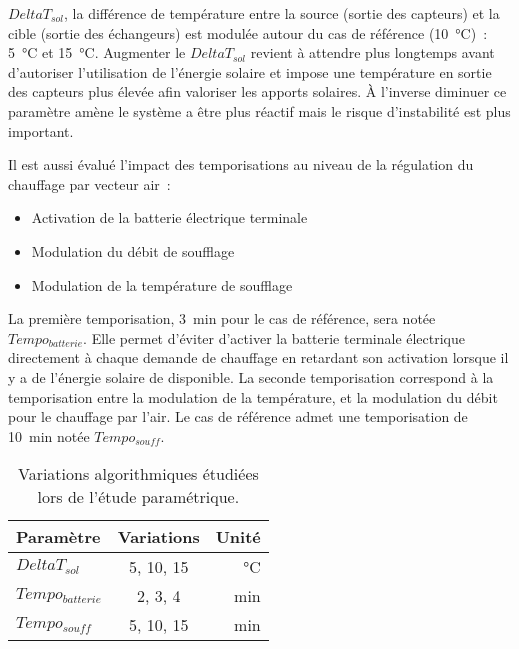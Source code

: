 $DeltaT_{sol}$, la différence de température entre la source (sortie des capteurs) et la cible (sortie des
échangeurs) est modulée autour du cas de référence (\SI{10}{\celsius})~: \SI{5}{\celsius} et \SI{15}{\celsius}.
Augmenter le $DeltaT_{sol}$ revient à
attendre plus longtemps avant d’autoriser l’utilisation de l’énergie solaire et impose une
température en sortie des capteurs plus élevée afin valoriser les apports solaires. À
l’inverse diminuer ce paramètre amène le système a être plus réactif mais le risque
d’instabilité est plus important.

Il est aussi évalué l’impact des temporisations au niveau de la régulation du chauffage
par vecteur air~:
\begin{itemize}
  \item Activation de la batterie électrique terminale
  \item Modulation du débit de soufflage
  \item Modulation de la température de soufflage
\end{itemize}

La première temporisation, \SI{3}{min} pour le cas de référence, sera notée
$Tempo_{batterie}$. Elle permet d’éviter d’activer la batterie terminale électrique
directement à chaque demande de chauffage en retardant son activation lorsque il y a de
l’énergie solaire de disponible. La seconde temporisation correspond à la temporisation
entre la modulation de la température, et la modulation du débit pour le chauffage par
l’air. Le cas de référence admet une temporisation de \SI{10}{min} notée $Tempo_{souff}$.

\begin{table}
\centering
\begin{tabular}{l c r}
    \toprule
    Paramètre          & Variations                    & Unité         \\
    \midrule
    $DeltaT_{sol}$     & \num{5}, \num{10}, \num{15}   & \si{\celsius} \\
    $Tempo_{batterie}$ & \num{2}, \num{3}, \num{4}     & \si{min}      \\
    $Tempo_{souff}$    & \num{5}, \num{10}, \num{15}   & \si{min}      \\
    \bottomrule
\end{tabular}
\caption{Variations algorithmiques étudiées lors de l’étude paramétrique.
         \label{tab:variations_algo}}
\end{table}



